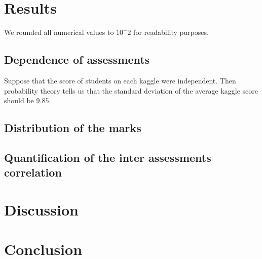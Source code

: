 \documentclass[a4paper]{article}
\begin{document}
\section{Results}
We rounded all numerical values to $10^-2$ for readability purposes.
\subsection{Dependence of assessments}
Suppose that the score of students on each kaggle were independent.
Then probability theory tells us that the standard deviation of the average kaggle score should be $9.85$.

\subsection{Distribution of the marks}
\subsection{Quantification of the inter assessments correlation}
\section{Discussion}
\section{Conclusion}
\end{document}
